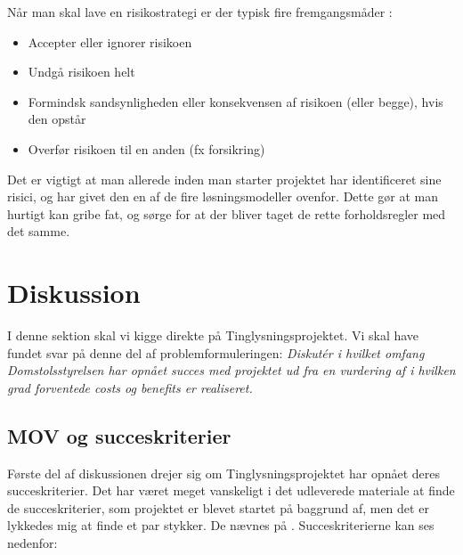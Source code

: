 \documentclass[10pt,a4paper,danish]{article}
\begin{document}
Når man skal lave en risikostrategi er der typisk fire fremgangsmåder \cite[~s. 210]{Marchewka}:

\begin{itemize}
\item Accepter eller ignorer risikoen
\item Undgå risikoen helt
\item Formindsk sandsynligheden eller konsekvensen af risikoen (eller begge), hvis den opstår
\item Overfør risikoen til en anden (fx forsikring)
\end{itemize}

Det er vigtigt at man allerede inden man starter projektet har identificeret sine risici, og har givet den en af de fire løsningsmodeller ovenfor. Dette gør at man hurtigt kan gribe fat, og sørge for at der bliver taget de rette forholdsregler med det samme.



\section{Diskussion}



I denne sektion skal vi kigge direkte på Tinglysningsprojektet. Vi skal have fundet svar på denne del af problemformuleringen: \textit{Diskutér i hvilket omfang Domstolsstyrelsen har opnået succes med projektet ud fra en vurdering af i hvilken grad forventede costs og benefits er realiseret.}

\subsection{MOV og succeskriterier}
Første del af diskussionen drejer sig om Tinglysningsprojektet har opnået deres succeskriterier. Det har været meget vanskeligt i det udleverede materiale at finde de succeskriterier, som projektet er blevet startet på baggrund af, men det er lykkedes mig at finde et par stykker. De nævnes på \cite[~s.33]{Rigs}. Succeskriterierne kan ses nedenfor:
\end{document}
